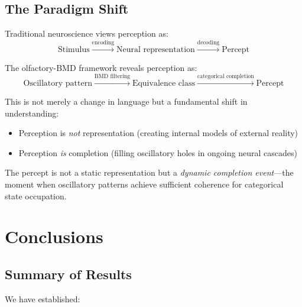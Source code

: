 \documentclass[12pt,a4paper]{article}
\begin{document}
\subsection{The Paradigm Shift}

Traditional neuroscience views perception as:
\begin{equation}
\text{Stimulus} \xrightarrow{\text{encoding}} \text{Neural representation} \xrightarrow{\text{decoding}} \text{Percept}
\end{equation}

The olfactory-BMD framework reveals perception as:
\begin{equation}
\text{Oscillatory pattern} \xrightarrow{\text{BMD filtering}} \text{Equivalence class} \xrightarrow{\text{categorical completion}} \text{Percept}
\end{equation}

This is not merely a change in language but a fundamental shift in understanding:
\begin{itemize}
\item Perception is \textit{not} representation (creating internal models of external reality)
\item Perception \textit{is} completion (filling oscillatory holes in ongoing neural cascades)
\end{itemize}

The percept is not a static representation but a \textit{dynamic completion event}—the moment when oscillatory patterns achieve sufficient coherence for categorical state occupation.

\section{Conclusions}

\subsection{Summary of Results}

We have established:
\end{document}
